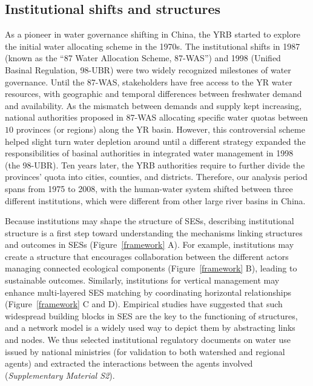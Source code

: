 
\subsection{Institutional shifts and structures}
\label{results-1}

As a pioneer in water governance shifting in China, the YRB started to explore the initial water allocating scheme in the 1970s.
The institutional shifts in 1987 (known as the ``87 Water Allocation Scheme, 87-WAS'') and 1998 (Unified Basinal Regulation, 98-UBR) were two widely recognized milestones of water governance.
Until the 87-WAS, stakeholders have free access to the YR water resources, with geographic and temporal differences between freshwater demand and availability.
As the mismatch between demands and supply kept increasing, national authorities proposed in 87-WAS allocating specific water quotas between $10$ provinces (or regions) along the YR basin.
However, this controversial scheme helped slight turn water depletion around until a different strategy expanded the responsibilities of basinal authorities in integrated water management in 1998 (the 98-UBR).
Ten years later, the YRB authorities require to further divide the provinces' quota into cities, counties, and districts.
Therefore, our analysis period spans from 1975 to 2008, with the human-water system shifted between three different institutions, which were different from other large river basins in China.

Because institutions may shape the structure of SESs, describing institutional structure is a first step toward understanding the mechanisms linking structures and outcomes in SESs (Figure~\ref{framework} A).
For example, institutions may create a structure that encourages collaboration between the different actors managing connected ecological components (Figure~\ref{framework} B), leading to sustainable outcomes.
Similarly, institutions for vertical management may enhance multi-layered SES matching by coordinating horizontal relationships (Figure~\ref{framework} C and D).
Empirical studies have suggested that such widespread building blocks in SES are the key to the functioning of structures, and a network model is a widely used way to depict them by abstracting links and nodes.
We thus selected institutional regulatory documents on water use issued by national ministries (for validation to both watershed and regional agents) and extracted the interactions between the agents involved (\textit{Supplementary Material S2}).

